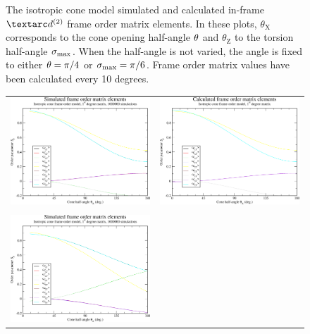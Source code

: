 \begin{figure}
\begin{tabular}{@{}cc@{}}
  \end{tabular}
  \caption[Isotropic cone simulated and calculated in-frame Daeg$^{(2)}$ elements.]{
    The isotropic cone model simulated and calculated in-frame $\FOtwo$ frame order matrix elements.
    In these plots, $\theta_\textrm{X}$ corresponds to the cone opening half-angle $\theta$ and $\theta_\textrm{Z}$ to the torsion half-angle $\sigma_\textrm{max}$.
    When the half-angle is not varied, the angle is fixed to either $\theta = \pi/4$ or $\sigma_\textrm{max} = \pi/6$.
    Frame order matrix values have been calculated every 10 degrees.
  }
  \label{fig: simulated and calculated in-frame 2nd degree iso cone frame order}
\end{figure}

\begin{figure}
\centering
  \begin{tabular}{@{}cc@{}}
    \includegraphics[width=.5\textwidth]{images/frame_order_matrix/Sij_iso_cone_out_of_frame_theta_x_ens1000000.eps} &
    \includegraphics[width=.5\textwidth]{images/frame_order_matrix/Sij_iso_cone_out_of_frame_theta_x_calc.eps} \\
    \\[-5pt]
    \includegraphics[width=.5\textwidth]{images/frame_order_matrix/Sij_iso_cone_out_of_frame_theta_z_ens1000000.eps} &

\end{tabular}
\end{figure}
